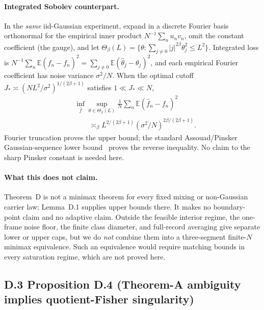 \paragraph{Integrated Sobolev counterpart.} In the \emph{same} iid-Gaussian experiment, expand in a discrete Fourier basis orthonormal for the empirical inner product $N^{-1}\sum_n u_nv_n$, omit the constant coefficient (the gauge), and let $\Theta_\beta(L)=\{\theta:\sum_{j\ne0}|j|^{2\beta}\theta_j^2\le L^2\}$. Integrated loss is $N^{-1}\sum_n\mathbb E(\hat f_n-f_n)^2=\sum_{j\ne0}\mathbb E(\hat\theta_j-\theta_j)^2$, and each empirical Fourier coefficient has noise variance $\sigma^2/N$. When the optimal cutoff $J_*\asymp(NL^2/\sigma^2)^{1/(2\beta+1)}$ satisfies $1\ll J_*\ll N$,
\begin{equation}
\begin{aligned}
&\inf_{\hat f}\sup_{\theta\in\Theta_\beta(L)}
\frac1N\sum_n\mathbb E(\hat f_n-f_n)^2\\
&\qquad\asymp_\beta
L^{2/(2\beta+1)}
(\sigma^2/N)^{2\beta/(2\beta+1)}.
\end{aligned}
\tag{D.6}
\end{equation}
Fourier truncation proves the upper bound; the standard Assouad/Pinsker Gaussian-sequence lower bound~\cite{Pinsker1980,Tsybakov2009} proves the reverse inequality. No claim to the sharp Pinsker constant is needed here.

\paragraph{What this does not claim.} Theorem~D is not a minimax theorem for every fixed mixing or non-Gaussian carrier law; Lemma~D.1 supplies upper bounds there. It makes no boundary-point claim and no adaptive claim. Outside the feasible interior regime, the one-frame noise floor, the finite class diameter, and full-record averaging give separate lower or upper caps, but we do \emph{not} combine them into a three-segment finite-$N$ minimax equivalence. Such an equivalence would require matching bounds in every saturation regime, which are not proved here.

\subsection{D.3 Proposition D.4 (Theorem-A ambiguity implies quotient-Fisher singularity)}

